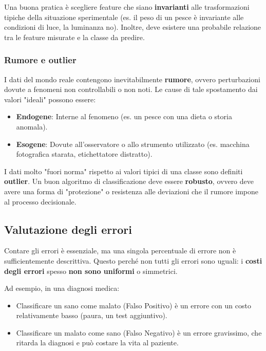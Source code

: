 Una buona pratica è scegliere feature che siano
\textbf{invarianti} alle trasformazioni tipiche della
situazione sperimentale (es. il peso di un pesce è
invariante alle condizioni di luce, la luminanza no).
Inoltre, deve esistere una probabile relazione tra le
feature misurate e la classe da predire.

\subsubsection{Rumore e outlier}
I dati del mondo reale contengono inevitabilmente
\textbf{rumore}, ovvero perturbazioni dovute a fenomeni
non controllabili o non noti. Le cause di tale
spostamento dai valori "ideali" possono essere:
\begin{itemize}
    \item \textbf{Endogene}: Interne al fenomeno (es. un pesce
    con una dieta o storia anomala).
    \item \textbf{Esogene}: Dovute all'osservatore o allo
    strumento utilizzato (es. macchina fotografica starata,
    etichettatore distratto).
\end{itemize}

I dati molto "fuori norma" rispetto ai valori tipici di una
classe sono definiti \textbf{outlier}.
Un buon algoritmo di classificazione deve essere
\textbf{robusto}, ovvero deve avere una forma di
"protezione" o resistenza alle deviazioni che il rumore
impone al processo decisionale.

\subsection{Valutazione degli errori}

Contare gli errori è essenziale, ma una singola percentuale
di errore non è sufficientemente descrittiva. Questo perché
non tutti gli errori sono uguali: i \textbf{costi degli errori}
spesso \textbf{non sono uniformi} o simmetrici.

Ad esempio, in una diagnosi medica:
\begin{itemize}
    \item Classificare un sano come malato (Falso Positivo)
    è un errore con un costo relativamente basso (paura, un
    test aggiuntivo).
    \item Classificare un malato come sano (Falso Negativo)
    è un errore gravissimo, che ritarda la diagnosi e
    può costare la vita al paziente.
\end{itemize}

